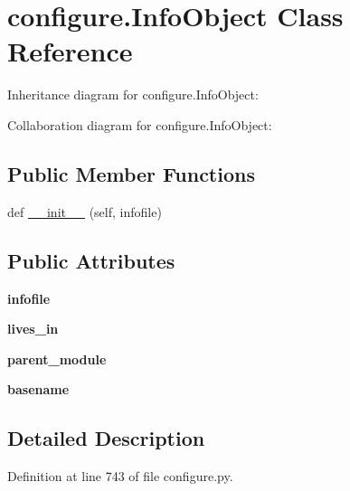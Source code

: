 \hypertarget{classconfigure_1_1_info_object}{}\section{configure.\+Info\+Object Class Reference}
\label{classconfigure_1_1_info_object}


Inheritance diagram for configure.\+Info\+Object\+:


Collaboration diagram for configure.\+Info\+Object\+:
\subsection*{Public Member Functions}
\begin{DoxyCompactItemize}
\item 
def \mbox{\hyperlink{classconfigure_1_1_info_object_a1bd87b98b6c42e69a04d6294a1452577}{\+\_\+\+\_\+init\+\_\+\+\_\+}} (self, infofile)
\end{DoxyCompactItemize}
\subsection*{Public Attributes}
\begin{DoxyCompactItemize}
\item 
\mbox{\label{classconfigure_1_1_info_object_aa84a919453d70c2cb869ab992ece2e2e}} 
{\bfseries infofile}
\item 
\mbox{\label{classconfigure_1_1_info_object_a3b097d3ff1cf8120fa2b8e2e93a5b307}} 
{\bfseries lives\+\_\+in}
\item 
\mbox{\label{classconfigure_1_1_info_object_a04091976e13268938b496890f72fe5d2}} 
{\bfseries parent\+\_\+module}
\item 
\mbox{\label{classconfigure_1_1_info_object_a700ff39104b4bfb90697b36aea121f90}} 
{\bfseries basename}
\end{DoxyCompactItemize}


\subsection{Detailed Description}


Definition at line 743 of file configure.\+py.



